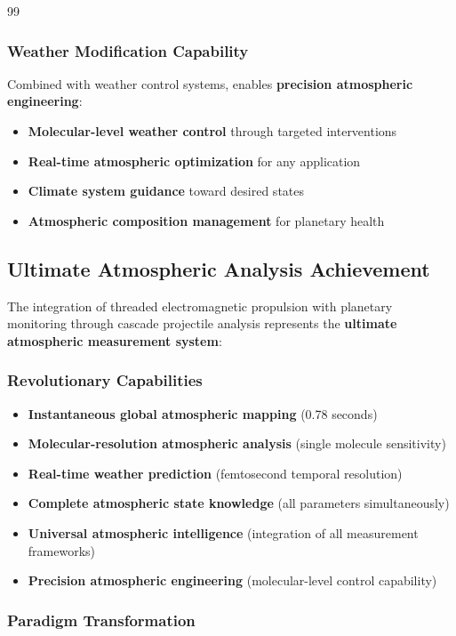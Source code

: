 \documentclass[12pt,a4paper]{article}
\begin{document}
\begin{thebibliography}{99}
\subsubsection{Weather Modification Capability}

Combined with weather control systems, enables \textbf{precision atmospheric engineering}:
\begin{itemize}
\item \textbf{Molecular-level weather control} through targeted interventions
\item \textbf{Real-time atmospheric optimization} for any application
\item \textbf{Climate system guidance} toward desired states
\item \textbf{Atmospheric composition management} for planetary health
\end{itemize}

\subsection{Ultimate Atmospheric Analysis Achievement}

The integration of threaded electromagnetic propulsion with planetary monitoring through cascade projectile analysis represents the \textbf{ultimate atmospheric measurement system}:

\subsubsection{Revolutionary Capabilities}
\begin{itemize}
\item \textbf{Instantaneous global atmospheric mapping} (0.78 seconds)
\item \textbf{Molecular-resolution atmospheric analysis} (single molecule sensitivity)
\item \textbf{Real-time weather prediction} (femtosecond temporal resolution)
\item \textbf{Complete atmospheric state knowledge} (all parameters simultaneously)
\item \textbf{Universal atmospheric intelligence} (integration of all measurement frameworks)
\item \textbf{Precision atmospheric engineering} (molecular-level control capability)
\end{itemize}

\subsubsection{Paradigm Transformation}


\end{thebibliography}
\end{document}
